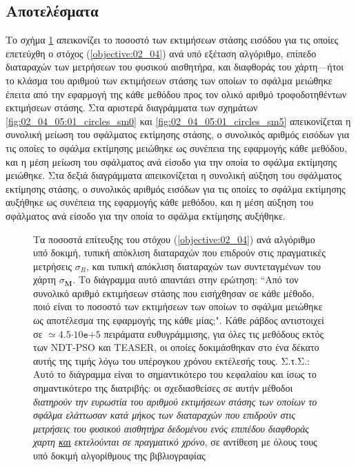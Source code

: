 \subsection{Αποτελέσματα}
\label{subsection:02_04_05:02}

Το σχήμα \ref{fig:02_04_05:01} απεικονίζει το ποσοστό των εκτιμήσεων στάσης
εισόδου για τις οποίες επετεύχθη ο στόχος (\ref{objective:02_04}) ανά υπό
εξέταση αλγόριθμο, επίπεδο διαταραχών των μετρήσεων του φυσικού αισθητήρα, και
διαφθοράς του χάρτη---ήτοι το κλάσμα του αριθμού των εκτιμήσεων στάσης των
οποίων το σφάλμα μειώθηκε έπειτα από την εφαρμογή της κάθε μεθόδου προς τον
ολικό αριθμό τροφοδοτηθέντων εκτιμήσεων στάσης. Στα αριστερά διαγράμματα των
σχημάτων \ref{fig:02_04_05:01_circles_sm0} και
\ref{fig:02_04_05:01_circles_sm5} απεικονίζεται η συνολική μείωση του σφάλματος
εκτίμησης στάσης, ο συνολικός αριθμός εισόδων για τις οποίες το σφάλμα
εκτίμησης μειώθηκε ως συνέπεια της εφαρμογής κάθε μεθόδου, και η μέση μείωση
του σφάλματος ανά είσοδο για την οποία το σφάλμα εκτίμησης μειώθηκε. Στα δεξιά
διαγράμματα απεικονίζεται η συνολική αύξηση του σφάλματος εκτίμησης στάσης, ο
συνολικός αριθμός εισόδων για τις οποίες το σφάλμα εκτίμησης αυξήθηκε ως
συνέπεια της εφαρμογής κάθε μεθόδου, και η μέση αύξηση του σφάλματος ανά είσοδο
για την οποία το σφάλμα εκτίμησης αυξήθηκε.


\begin{figure}\vspace{1.5cm}\hspace{0.6cm}%
  
  \vspace{0.75cm}
  \caption{\small Τα ποσοστά επίτευξης του στόχου (\ref{objective:02_04}) ανά
           αλγόριθμο υπό δοκιμή, τυπική απόκλιση διαταραχών που επιδρούν στις
           πραγματικές μετρήσεις $\sigma_R$, και τυπική απόκλιση διαταραχών των
           συντεταγμένων του χάρτη $\sigma_{\bm{M}}$. Το διάγραμμα αυτό
           απαντάει στην ερώτηση: ``Από τον συνολικό αριθμό εκτιμήσεων στάσης
           που εισήχθησαν σε κάθε μέθοδο, ποιό είναι το ποσοστό των εκτιμήσεων
           των οποίων το σφάλμα μειώθηκε ως αποτέλεσμα της εφαρμογής της κάθε
           μίας;". Κάθε ράβδος αντιστοιχεί σε $\simeq
           4.5$$\cdot$$10\texttt{e}$$+$$5$ πειράματα ευθυγράμμισης, για όλες
           τις μεθόδους εκτός των NDT-PSO και TEASER, οι οποίες δοκιμάσθηκαν
           στο ένα δέκατο αυτής της τιμής λόγω του υπέρογκου χρόνου εκτέλεσής
           τους.  Σ.τ.Σ.: Αυτό το διάγραμμα είναι το σημαντικότερο του
           κεφαλαίου και ίσως το σημαντικότερο της διατριβής: οι σχεδιασθείσες
           σε αυτήν μέθοδοι \textit{διατηρούν την ευρωστία του αριθμού
           εκτιμήσεων στάσης των οποίων το σφάλμα ελάττωσαν κατά μήκος των
           διαταραχών που επιδρούν στις μετρήσεις του φυσικού αισθητήρα
           δεδομένου ενός επιπέδου διαφθοράς χαρτη \underline{και} εκτελούνται
           σε πραγματικό χρόνο}, σε αντίθεση με όλους τους υπό δοκιμή
           αλγορίθμους της βιβλιογραφίας}
  \label{fig:02_04_05:01}
\end{figure}

